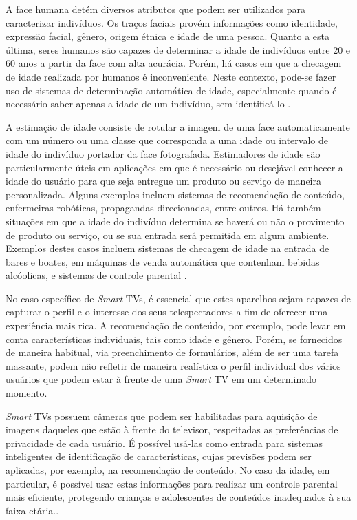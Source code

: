 
A face humana detém diversos atributos que podem ser utilizados para caracterizar indivíduos. Os traços faciais provém informações como identidade, expressão facial, gênero, origem étnica e idade de uma pessoa. Quanto a esta última, seres humanos são capazes de determinar a idade de indivíduos entre 20 e 60 anos a partir da face com alta acurácia. Porém, há casos em que a checagem de idade realizada por humanos é inconveniente. Neste contexto, pode-se fazer uso de sistemas de determinação automática de idade, especialmente quando é necessário saber apenas a idade de um indivíduo, sem identificá-lo \cite{fu2010age}.

A estimação de idade consiste de rotular a imagem de uma face automaticamente com um número ou uma classe que corresponda a uma idade ou intervalo de idade do indivíduo portador da face fotografada. Estimadores de idade são particularmente úteis em aplicações em que é necessário ou desejável conhecer a idade do usuário para que seja entregue um produto ou serviço de maneira personalizada. Alguns exemplos incluem sistemas de recomendação de conteúdo, enfermeiras robóticas, propagandas direcionadas, entre outros. Há também situações em que a idade do indivíduo determina se haverá ou não o provimento de produto ou serviço, ou se sua entrada será permitida em algum ambiente. Exemplos destes casos incluem sistemas de checagem de idade na entrada de bares e boates, em máquinas de venda automática que contenham bebidas alcóolicas, e sistemas de controle parental \cite{fu2010age}.

No caso específico de \emph{Smart} TVs, é essencial que estes aparelhos sejam capazes de capturar o perfil e o interesse dos seus telespectadores a fim de oferecer uma experiência mais rica. A recomendação de conteúdo, por exemplo, pode levar em conta características individuais, tais como idade e gênero. Porém, se fornecidos de maneira habitual, via preenchimento de formulários, além de ser uma tarefa massante, podem não refletir de maneira realística o perfil individual dos vários usuários que podem estar à frente de uma \emph{Smart} TV em um determinado momento.

\emph{Smart} TVs possuem câmeras que podem ser habilitadas para aquisição de imagens daqueles que estão à frente do televisor, respeitadas as preferências de privacidade de cada usuário. É possível usá-las como entrada para sistemas inteligentes de identificação de características, cujas previsões podem ser aplicadas, por exemplo, na recomendação de conteúdo. No caso da idade, em particular, é possível usar estas informações para realizar um controle parental mais eficiente, protegendo crianças e adolescentes de conteúdos inadequados à sua faixa etária.\cite{Guardian:CameraSmartv}.


